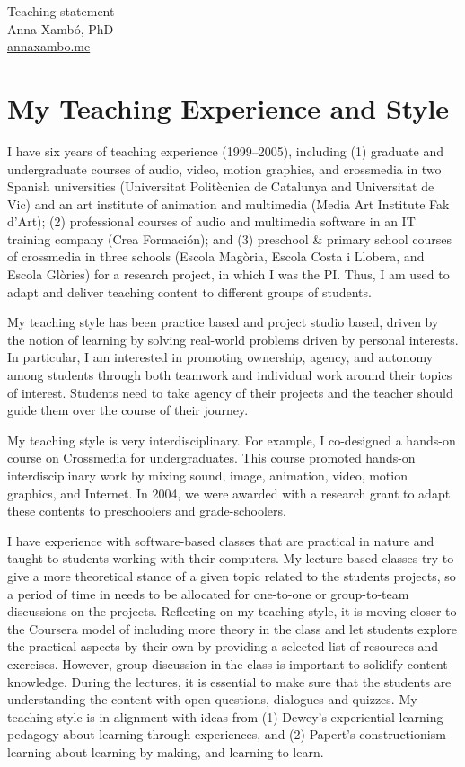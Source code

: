 \documentclass[10pt, a4paper]{article}
\begin{document}
{\LARGE Teaching statement}\\[0.2cm]
Anna Xambó, PhD\\
\href{http://annaxambo.me}{annaxambo.me}

\section*{My Teaching Experience and Style}

I have six years of teaching experience (1999--2005), including (1) graduate and undergraduate courses of audio, video, motion graphics, and crossmedia in two Spanish universities (Universitat Politècnica de Catalunya and Universitat de Vic) and an art institute of animation and multimedia (Media Art Institute Fak d’Art); (2) professional courses of audio and multimedia software in an IT training company (Crea Formación); and (3) preschool \& primary school courses of crossmedia in three schools (Escola Magòria, Escola Costa i Llobera, and Escola Glòries) for a research project, in which I was the PI. Thus, I am used to adapt and deliver teaching content to different groups of students.

My teaching style has been practice based and project studio based, driven by the notion of learning by solving real-world problems driven by personal interests. In particular, I am interested in promoting ownership, agency, and autonomy among students through both teamwork and individual work around their topics of interest. Students need to take agency of their projects and the teacher should guide them over the course of their journey. 

My teaching style is very interdisciplinary. For example, I co-designed a hands-on course on Crossmedia for undergraduates. This course promoted hands-on interdisciplinary work by mixing sound, image, animation, video, motion graphics, and Internet. In 2004, we were awarded with a research grant to adapt these contents to preschoolers and grade-schoolers.

I have experience with software-based classes that are practical in nature and taught to students working with their computers. My lecture-based classes try to give a more theoretical stance of a given topic related to the students projects, so a period of time in needs to be allocated for one-to-one or group-to-team discussions on the projects. Reflecting on my teaching style, it is moving closer to the Coursera model of including more theory in the class and let students explore the practical aspects by their own by providing a selected list of resources and exercises. However, group discussion in the class is important to solidify content knowledge. During the lectures, it is essential to make sure that the students are understanding the content with open questions, dialogues and quizzes. My teaching style is in alignment with ideas from (1) Dewey's experiential learning pedagogy about learning through experiences, and (2) Papert's constructionism learning about learning by making, and learning to learn.
\end{document}
